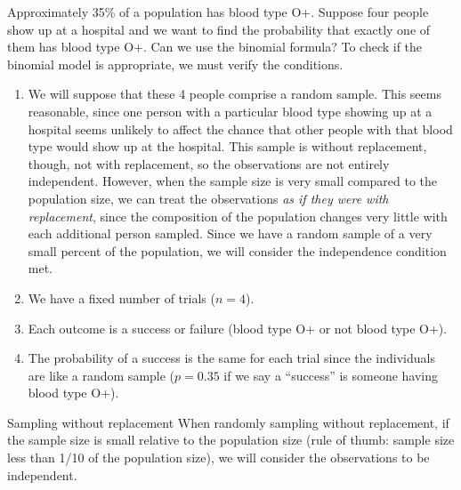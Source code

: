 \begin{examplewrap}
\begin{nexample}{Approximately 35\% of a population has blood type O+.  Suppose four people show up at a hospital and we want to find the probability that exactly one of them has blood type O+.  Can we use the binomial formula?  }
To check if the binomial model is appropriate,
  we must verify the conditions.
\begin{enumerate}
\setlength{\itemsep}{0mm}
\item We will suppose that these 4 people comprise a random sample.  This seems reasonable, since one person with a particular blood type showing up at a hospital seems unlikely to affect the chance that other people with that blood type would show up at the hospital.  This sample is without replacement, though, not with replacement, so the observations are not entirely independent.  However, when the sample size is very small compared to the population size, we can treat the observations \emph{as if they were with replacement}, since the composition of the population changes very little with each additional person sampled.  Since we have a random sample of a very small percent of the population, we will consider the independence condition met.  
\item We have a fixed number of trials ($n=4$).
\item Each outcome is a success or failure (blood type O+ or not blood type O+).
\item The probability of a success is the same for each
  trial  since the individuals are like a random sample
  ($p=0.35$ if we say a ``success'' is someone having blood type O+).
\end{enumerate}
\end{nexample}
\end{examplewrap}

\begin{onebox}{Sampling without replacement}
When randomly sampling without replacement, if the sample size is small relative to the population size (rule of thumb: sample size less than 1/10 of the population size), we will consider the observations to be independent. 
\end{onebox}


